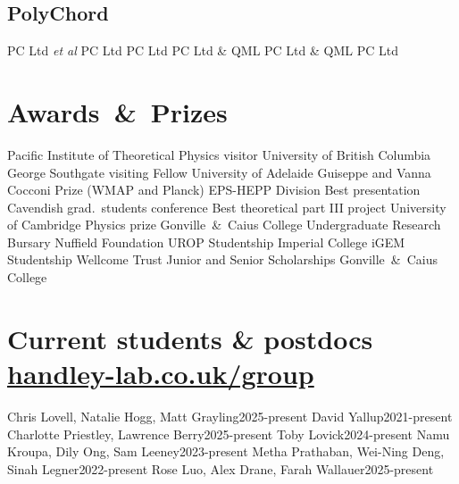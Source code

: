 \documentclass[11pt,a4paper,sans]{moderncv}
\begin{document}
\subsection{PolyChord}
 {PC Ltd \textit{et al}}{}{}
 {PC Ltd}{}{}
 {PC Ltd}{}{}
 {PC Ltd \& QML}{}{}
 {PC Ltd \& QML}{}{}
 {}{}{}
 {PC Ltd}{}{}
 {}{}{}
 {}{}{}
 {}{}{}

\section{Awards~\&~Prizes}
  {Pacific Institute of Theoretical Physics visitor}         {University of British Columbia}
  {George Southgate visiting Fellow}         {University of Adelaide}
  {Guiseppe and Vanna Cocconi Prize (WMAP and Planck)}         {EPS-HEPP Division}
  {Best presentation}                 {Cavendish grad.\ students conference}
  {Best theoretical part III project} {University of Cambridge} 
\cvitemwithcomment{}            {Physics prize}                     {Gonville~\&~Caius College} 
 {Undergraduate Research Bursary}    {Nuffield Foundation}  
\cvitemwithcomment{}            {UROP Studentship}                  {Imperial College} 
 {iGEM Studentship}                  {Wellcome Trust} 
    {Junior and Senior Scholarships}    {Gonville~\&~Caius College} 

\pagebreak
\section{Current students \& postdocs \hfill\href{https://www.handley-lab.co.uk/group}{handley-lab.co.uk/group}}
  {Chris Lovell, Natalie Hogg, Matt Grayling}{2025-present}
\cvitemwithcomment{}  {David Yallup}{2021-present}
 {Charlotte Priestley, Lawrence Berry}{2025-present}
\cvitemwithcomment{} {Toby Lovick}{2024-present}
\cvitemwithcomment{} {Namu Kroupa, Dily Ong, Sam Leeney}{2023-present}
\cvitemwithcomment{} {Metha Prathaban, Wei-Ning Deng, Sinah Legner}{2022-present}
 {Rose Luo, Alex Drane, Farah Wallauer}{2025-present}
\end{document}
